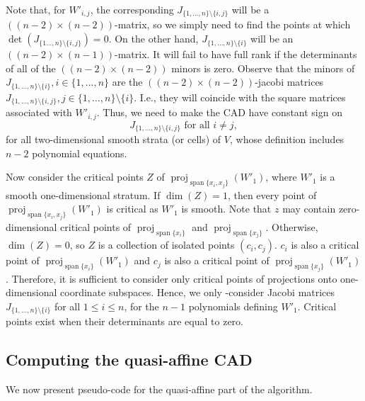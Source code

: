 \documentclass[
]{book}
\theoremstyle{definition}
\theoremstyle{definition}
\theoremstyle{definition}
\theoremstyle{definition}
\theoremstyle{remark}
\begin{document}
Note that, for \(W'_{i,j}\), the corresponding \(J_{\{1,\ldots,n\} \setminus \{i,j\}}\) will be a \(((n-2) \times (n-2))\)-matrix, so we simply need to find the points at which \(\det(J_{\{1\ldots,n\} \setminus \{i,j\}}) = 0\).
On the other hand, \(J_{\{1,\ldots,n\} \setminus \{i\}}\) will be an \(((n-2) \times (n-1))\)-matrix. It will fail to have full rank if the determinants of all of the \(((n-2) \times (n-2))\) minors is zero. Observe that the minors of \(J_{\{1,\ldots,n\} \setminus \{i\}}, i \in \{1,\ldots,n\}\) are the \(((n-2)\times (n-2))\)-jacobi matrices \(J_{\{1,\ldots,n\} \setminus \{i,j\}}, j \in \{1,\ldots,n\} \setminus \{i\}\). I.e., they will coincide with the square matrices associated with \(W'_{i,j}\). Thus, we need to make the CAD have constant sign on
\[
J_{\{1,\ldots,n\} \setminus \{i,j\}} \text{ for all } i \ne j,
\]
for all two-dimensional smooth strata (or cells) of \(V\), whose definition includes \(n-2\) polynomial equations.

Now consider the critical points \(Z\) of \({\operatorname{proj}_{{\operatorname{span} \{x_i,x_j\}}}}(W'_1)\), where \(W'_1\) is a smooth one-dimensional stratum. If \(\dim(Z) = 1\), then every point of \({\operatorname{proj}_{{\operatorname{span} \{x_i,x_j\}}}}(W'_1)\) is critical as \(W'_1\) is smooth. Note that \(z\) may contain zero-dimensional critical points of \({\operatorname{proj}_{{\operatorname{span} \{x_i\}}}}\) and \({\operatorname{proj}_{{\operatorname{span} \{x_j\}}}}\).
Otherwise, \(\dim(Z) = 0\), so \(Z\) is a collection of isolated points \((c_i,c_j)\). \(c_i\) is also a critical point of \({\operatorname{proj}_{{\operatorname{span} \{x_i\}}}}(W'_1)\) and \(c_j\) is also a critical point of \({\operatorname{proj}_{{\operatorname{span} \{x_j\}}}}(W'_1)\). Therefore, it is sufficient to consider only critical points of projections onto one-dimensional coordinate subspaces. Hence, we only -consider Jacobi matrices
\(J_{\{1,\ldots,n\} \setminus \{i\}}\) for all \(1\le i \le n\), for the \(n-1\) polynomials defining \(W'_1\). Critical points exist when their determinants are equal to zero.

\hypertarget{sec:quasiaffine-algorithm}{%
\subsection{Computing the quasi-affine CAD}\label{sec:quasiaffine-algorithm}}

We now present pseudo-code for the quasi-affine part of the algorithm.
\end{document}
